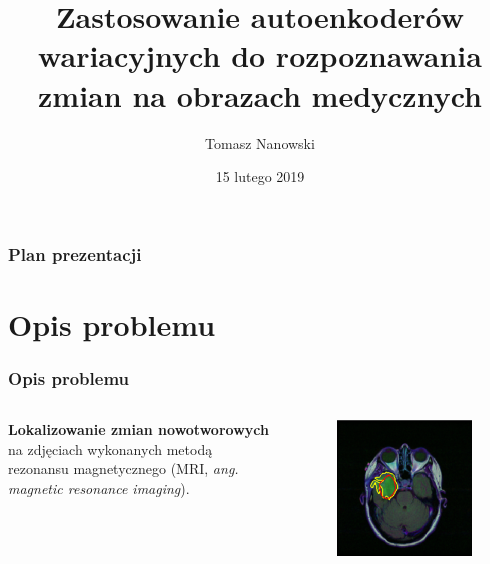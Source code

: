 \documentclass[polish, 13pt]{beamer}
\title{Zastosowanie autoenkoderów wariacyjnych do rozpoznawania zmian na obrazach medycznych}
\author{Tomasz Nanowski}
\date{15 lutego 2019}
\institute{II UWr}
\begin{document}
\begin{frame}
\titlepage
\end{frame}

\begin{frame}
\frametitle{Plan prezentacji}
\tableofcontents
\end{frame}

\section{Opis problemu}

\begin{frame}
 \frametitle{Opis problemu}
 \begin{columns}
  \textbf{Lokalizowanie zmian nowotworowych} na zdjęciach wykonanych metodą rezonansu magnetycznego (MRI, \textit{ang. magnetic resonance imaging}).
  \begin{figure}
    \includegraphics[scale=0.4]{images/MRI}
   \end{figure}
 \end{columns}
\end{frame}

\newcommand\pro{\item[$+$]}
\newcommand\con{\item[$-$]}
\end{document}
